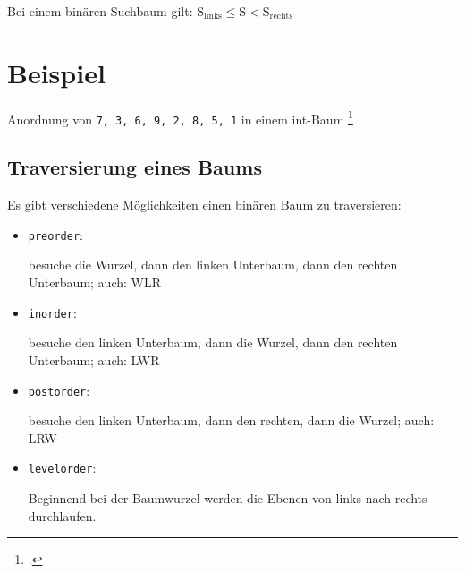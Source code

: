 \documentclass{bschlangaul-haupt}
\begin{document}
Bei einem binären Suchbaum gilt:
$\text{S}_\text{links} \leq \text{S} < \text{S}_\text{rechts}$

\section{Beispiel}

Anordnung von \verb|7, 3, 6, 9, 2, 8, 5, 1| in einem int-Baum
\footcite[Seite 5]{aud:fs:5}

\begin{center}
\end{center}

%

\subsection{Traversierung eines Baums}

Es gibt verschiedene Möglichkeiten einen binären Baum zu
traversieren:

\begin{itemize}
\item \texttt{preorder}:

besuche die Wurzel, dann den linken Unterbaum, dann den rechten
Unterbaum; auch: WLR


\item \texttt{inorder}:

besuche den linken Unterbaum, dann die Wurzel, dann den rechten
Unterbaum;
auch: LWR


\item \texttt{postorder}:

besuche den linken Unterbaum, dann den rechten, dann die Wurzel;
auch: LRW


\item \texttt{levelorder}:

Beginnend bei der Baumwurzel werden die
Ebenen von links nach rechts durchlaufen.


\end{itemize}
\end{document}
